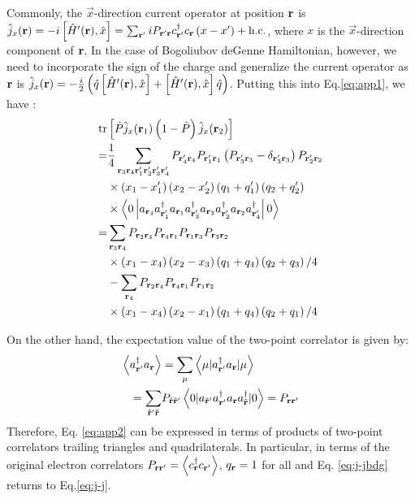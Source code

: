 \documentclass[amsmath,amssymb, aps, prx, longbibliography, twocolumn]{revtex4-1}
\begin{document}
Commonly, the $\vec{x}$-direction current operator at position ${\bf r}$ is $\hat{j}_x({\bf r})=-i\left[\hat{H}'({\bf r}),\hat x\right]=\sum_{{\bf r}'}iP_{{\bf r}'{\bf r}}c_{{\bf r}'}^\dagger c_{{\bf r}}\left(x-x'\right)+\mbox{h.c.}$, where $x$ is the $\vec{x}$-direction component of ${\bf r}$. In the case of Bogoliubov deGenne Hamiltonian, however, we need to incorporate the sign of the charge and generalize the current operator as ${\bf r}$ is $\hat{j}_x({\bf r})=-\frac{i}{2}\left(\hat{q}\left[\hat{H}'({\bf r}),\hat x\right]+\left[\hat{H}'({\bf r}),\hat x\right]\hat{q}\right)$. Putting this into Eq.\ref{eq:app1}, we have :
\begin{equation}
\left.
\begin{aligned}
\mbox{tr}&\left[\hat{P} \hat{j}_x({\bf r}_1) \left(1-\hat{P}\right) \hat{j}_x({\bf r}_2)\right]  \\
=& \frac{1}{4} \sum_{{\bf r}_3 {\bf r}_4 {\bf r}'_1 {\bf r}'_2{\bf r}'_3{\bf r}'_4}P_{{\bf r}'_4 {\bf r}_4}P_{{\bf r}'_1{\bf r}_1}\left(P_{{\bf r}'_3{\bf r}_3}-\delta_{{\bf r}'_3{\bf r}_3}\right)P_{{\bf r}'_2{\bf r}_2} \\&\times\left(x_1-x'_1\right)\left(x_2-x'_2\right)\left(q_1+q'_1\right)\left(q_2+q'_2\right)
\\&\times\left\langle0\left|a_{{\bf r}_4}a^\dagger_{{\bf r}'_1} a_{{\bf r}_1} a^\dagger_{{\bf r}'_3} a_{{\bf r}_3} a^\dagger_{{\bf r}'_2} a_{{\bf r}_2} a^\dagger_{{\bf r}'_4}\right|0\right\rangle \\
=& \sum_{{\bf r}_3 {\bf r}_4}P_{{\bf r}_2 {\bf r}_4}P_{{\bf r}_4{\bf r}_1}P_{{\bf r}_1{\bf r}_3}P_{{\bf r}_3{\bf r}_2}\\
&\times\left(x_1-x_4\right)\left(x_2-x_3\right)\left(q_1+q_4\right)\left(q_2+q_3\right)/4 \\
 &- \sum_{{\bf r}_4}P_{{\bf r}_2 {\bf r}_4}P_{{\bf r}_4{\bf r}_1}P_{{\bf r}_1{\bf r}_2}\\
 &\times\left(x_1-x_4\right)\left(x_2-x_1\right)\left(q_1+q_4\right)\left(q_2+q_1\right)/4
\label{eq:app2}\end{aligned}\right.
\end{equation}

On the other hand, the expectation value of the two-point correlator is given by:
\begin{equation}
\left. \begin{aligned}
\left\langle a_{{\bf r}'}^{\dagger}a_{{\bf r}}\right\rangle  &= \sum_{\mu}\left\langle \mu|a_{{\bf r}'}^{\dagger}a_{{\bf r}}|\mu\right\rangle \\
  =\sum_{\tilde{{\bf r}}' \tilde{{\bf r}}}&P_{\tilde{{\bf r}}\tilde{{\bf r}}'}\left\langle 0|a_{\tilde{{\bf r}}'}a_{{\bf r}'}^{\dagger}a_{{\bf r}}a_{\tilde{{\bf r}}}^{\dagger}|0\right\rangle  =P_{{\bf r}{\bf r}'}
\end{aligned}\right. 
\label{eq:j-jbdg}
\end{equation}
Therefore, Eq. \ref{eq:app2} can be expressed in terms of products of two-point correlators trailing triangles and quadrilaterals. In particular, in terms of the original electron correlators $P_{\bf{r}\bf{r}'}=\left\langle c^\dagger_{\bf{r}}c_{\bf{r}'} \right\rangle$, $q_{\bf{r}}=1$ for all and Eq. \ref{eq:j-jbdg} returns to Eq.\ref{eq:j-j}. 
\end{document}

